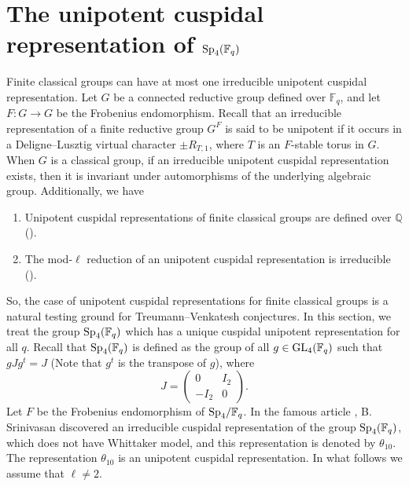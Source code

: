 \documentclass[10pt, reqno]{amsart}
\theoremstyle{plain}
\numberwithin{equation}{section} \newcommand{\di}{\operatorname{dim}}
\begin{document}
\section{The unipotent cuspidal representation of
\texorpdfstring{${\rm Sp}_4(\mathbb{F}_q)$}{}}\label{sec_theta10}
Finite classical groups can have at most one irreducible
unipotent cuspidal representation. 
Let $G$ be a connected reductive group defined over $\mathbb{F}_q$,
and let $F:G\rightarrow G$ be the Frobenius endomorphism.  
Recall that an irreducible
representation of a finite reductive group $G^F$
is said to be unipotent if it occurs in a 
Deligne--Lusztig virtual character $\pm R_{T, 1}$, 
where $T$ is an $F$-stable torus in $G$. 
When $G$ is a classical group, if an irreducible  unipotent cuspidal 
representation exists, then it is invariant under automorphisms of the 
underlying algebraic group. Additionally, we have
\begin{enumerate}
    \item  Unipotent cuspidal representations of finite classical groups 
    are defined over $\mathbb{Q}$ (\cite{Lusztig_rationality_unipotent}).
    \item The mod-$\ell$ reduction of an unipotent cuspidal representation is 
irreducible (\cite[Theorem 1]{Malle_Dudas_unipotent_cuspidal}).
\end{enumerate}
So, the case of unipotent cuspidal representations for finite
classical groups is a natural testing ground for Treumann--Venkatesh
conjectures. In this section, we treat the group
${\rm Sp}_4(\mathbb{F}_q)$ which has a unique cuspidal unipotent
representation for all $q$.  Recall that ${\rm Sp}_4(\mathbb{F}_q)$ is
defined as the group of all $g\in {\rm GL}_4(\mathbb{F}_q)$ such that
$gJg^{t} = J$ (Note that $g^t$ is the transpose of $g$), where
$$ J =\begin{pmatrix}
	0 & I_2\\
	-I_2 & 0
\end{pmatrix}.$$
Let $F$ be the Frobenius endomorphism of ${\rm Sp}_4/\mathbb{F}_q$. 
In the famous article \cite{Srinivasan-Sp4}, 
B. Srinivasan discovered an irreducible 
cuspidal representation of the group ${\rm Sp}_4
(\mathbb{F}_q)$, which does not have Whittaker model, and this 
representation is denoted by $\theta_{10}$. The representation 
$\theta_{10}$ is an unipotent cuspidal representation. In what 
follows we assume that $\ell\neq 2$. 
\end{document}
